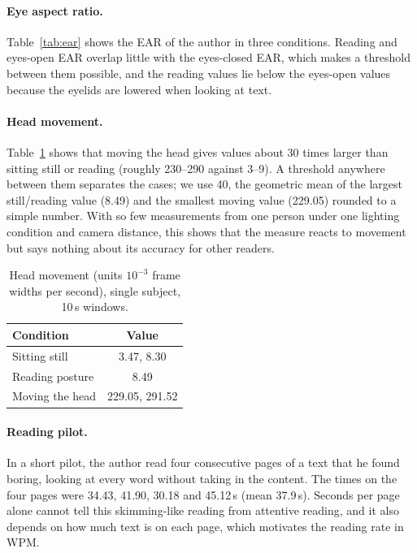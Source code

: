 \documentclass[sigconf,nonacm]{acmart}
\begin{document}
\paragraph{Eye aspect ratio.} Table~\ref{tab:ear} shows the EAR of the author in three conditions. Reading and eyes-open
EAR overlap little with the eyes-closed EAR, which makes a threshold between them possible, and the reading values lie
below the eyes-open values because the eyelids are lowered when looking at text.


\paragraph{Head movement.} Table~\ref{tab:head} shows that moving the head gives values about 30 times larger than sitting still or reading
(roughly 230--290 against 3--9). A threshold anywhere between them separates the cases; we use 40, the geometric mean of the
largest still/reading value (8.49) and the smallest moving value (229.05) rounded to a simple number. With so few
measurements from one person under one lighting condition and camera distance, this shows that the measure
reacts to movement but says nothing about its accuracy for other readers.

\begin{table}[t]
  \caption{Head movement (units $10^{-3}$ frame widths per second), single subject, 10\,s windows.}
  \label{tab:head}
  \begin{tabular}{lc}
    \toprule
    Condition & Value \\
    \midrule
    Sitting still & 3.47, 8.30 \\
    Reading posture & 8.49 \\
    Moving the head & 229.05, 291.52 \\
    \bottomrule
  \end{tabular}
\end{table}

\paragraph{Reading pilot.} In a short pilot, the author read four consecutive pages of a text that he found boring, looking
at every word without taking in the content. The times on the four pages were 34.43, 41.90, 30.18 and 45.12\,s
(mean 37.9\,s). Seconds per page alone cannot tell this skimming-like reading from attentive reading, and it also
depends on how much text is on each page, which motivates the reading rate in WPM.
\end{document}

